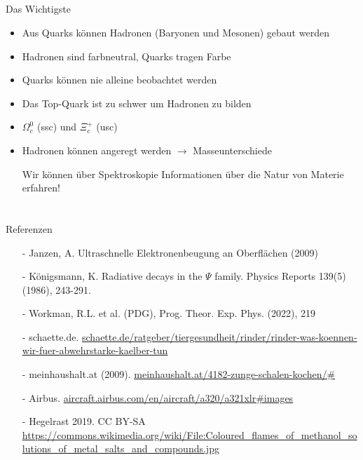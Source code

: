 \subsection{}
\begin{frame}{Das Wichtigste}
    \begin{itemize}
        \item Aus Quarks können Hadronen (Baryonen und Mesonen) gebaut werden
        \item Hadronen sind farbneutral, Quarks tragen Farbe
        \item Quarks können nie alleine beobachtet werden
        \item Das Top-Quark ist zu schwer um Hadronen zu bilden
        \item $\Omega_c^0$ (ssc) und $\Xi_c^+$ (usc)
        \item Hadronen können angeregt werden $\rightarrow$ Masseunterschiede 
        \item [\ding{43}] Wir können über Spektroskopie Informationen über die Natur von Materie erfahren!
    \end{itemize}
 \end{frame}
\section{}
\begin{frame}{Referenzen}\footnotesize
    \begin{itemize}
    \item[-] Janzen, A. Ultraschnelle Elektronenbeugung an Oberflächen (2009)
    \item[-] Königsmann, K. Radiative decays in the $\Psi$ family. Physics Reports 139(5)(1986), 243-291.
    \item[-] Workman, R.L. et al. (PDG), Prog. Theor. Exp. Phys. (2022), 219
\item[-] schaette.de. \url{schaette.de/ratgeber/tiergesundheit/rinder/rinder-was-koennen-wir-fuer-abwehrstarke-kaelber-tun}
\item[-] meinhaushalt.at (2009). \url{meinhaushalt.at/4182-zunge-schalen-kochen/#}
\item[-] Airbus. \url{aircraft.airbus.com/en/aircraft/a320/a321xlr#images}
\item[-] Hegelrast 2019. CC BY-SA \url{https://commons.wikimedia.org/wiki/File:Coloured_flames_of_methanol_solutions_of_metal_salts_and_compounds.jpg} 


    \end{itemize}
\end{frame}

